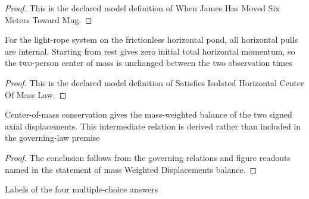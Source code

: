 \begin{proof}
  This is the declared model definition of When James Has Moved Six Meters Toward Mug.
\end{proof}
\begin{definition}
  \label{def:physics:phyx-mini-0817:phyxminiproblems-problemphyxmini0817-satisfiesisolatedhorizontalcenterofmasslaw}
  For the light-rope system on the frictionless horizontal pond, all horizontal pulls are internal. Starting from rest gives zero initial total horizontal momentum, so the two-person center of mass is unchanged between the two observation times
\end{definition}
\begin{proof}
  This is the declared model definition of Satisfies Isolated Horizontal Center Of Mass Law.
\end{proof}
\begin{theorem}
  \label{thm:physics:phyx-mini-0817:phyxminiproblems-problemphyxmini0817-massweighteddisplacements-balance}
  Center-of-mass conservation gives the mass-weighted balance of the two signed axial displacements. This intermediate relation is derived rather than included in the governing-law premise
\end{theorem}
\begin{proof}
  The conclusion follows from the governing relations and figure readouts named in the statement of mass Weighted Displacements balance.
\end{proof}
\begin{definition}
  \label{def:physics:phyx-mini-0817:phyxminiproblems-problemphyxmini0817-answerchoice}
  Labels of the four multiple-choice answers
\end{definition}
